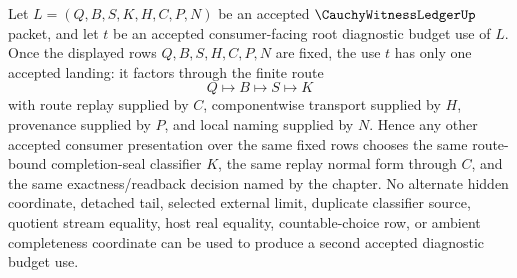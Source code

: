 \begin{corollary}
\label{cor:cauchy-witness-ledger-root-diagnostic-budget-use-determinacy}
Let $L=(Q,B,S,K,H,C,P,N)$ be an accepted $\CauchyWitnessLedgerUp$ packet, and let $t$ be an accepted consumer-facing root diagnostic budget use of $L$. Once the displayed rows $Q,B,S,H,C,P,N$ are fixed, the use $t$ has only one accepted landing: it factors through the finite route
$$
Q \longmapsto B \longmapsto S \longmapsto K
$$
with route replay supplied by $C$, componentwise transport supplied by $H$, provenance supplied by $P$, and local naming supplied by $N$. Hence any other accepted consumer presentation over the same fixed rows chooses the same route-bound completion-seal classifier $K$, the same replay normal form through $C$, and the same exactness/readback decision named by the chapter. No alternate hidden coordinate, detached tail, selected external limit, duplicate classifier source, quotient stream equality, host real equality, countable-choice row, or ambient completeness coordinate can be used to produce a second accepted diagnostic budget use.
\end{corollary}
